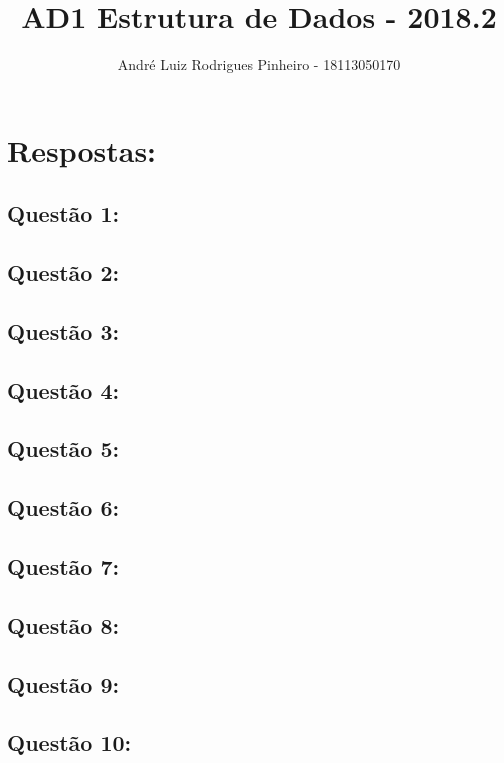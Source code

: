 \documentclass[a4paper,11pt]{article}
\title{AD1 Estrutura de Dados - 2018.2}
\author{André Luiz Rodrigues Pinheiro - 18113050170}
\begin{document}
\maketitle

\section*{Respostas:}

\subsection*{Questão 1:}


\subsection*{Questão 2:}


\subsection*{Questão 3:}


\subsection*{Questão 4:}
%

\subsection*{Questão 5:}
%

\subsection*{Questão 6:}
%

\subsection*{Questão 7:}
%

\subsection*{Questão 8:}


\subsection*{Questão 9:}


\subsection*{Questão 10:}

%
\end{document}
